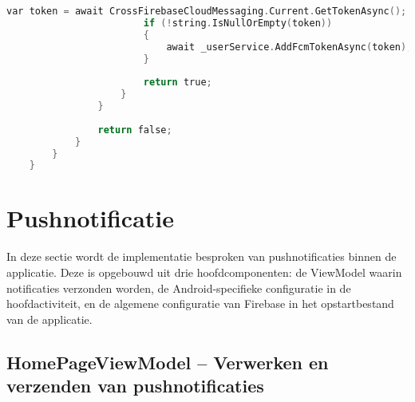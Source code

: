 \begin{lstlisting}[language=C, caption=Authenticatie via de ClientService, label=lst:login-clientservice]
                        var token = await CrossFirebaseCloudMessaging.Current.GetTokenAsync();
                        if (!string.IsNullOrEmpty(token))
                        {
                            await _userService.AddFcmTokenAsync(token);
                        }
                        
                        return true;
                    }
                }
                
                return false;
            }
        }
    }
\end{lstlisting}

\section{Pushnotificatie}

In deze sectie wordt de implementatie besproken van pushnotificaties binnen de applicatie. Deze is opgebouwd uit drie hoofdcomponenten: de ViewModel waarin notificaties verzonden worden, de Android-specifieke configuratie in de hoofdactiviteit, en de algemene configuratie van Firebase in het opstartbestand van de applicatie.

\subsection{HomePageViewModel – Verwerken en verzenden van pushnotificaties}

